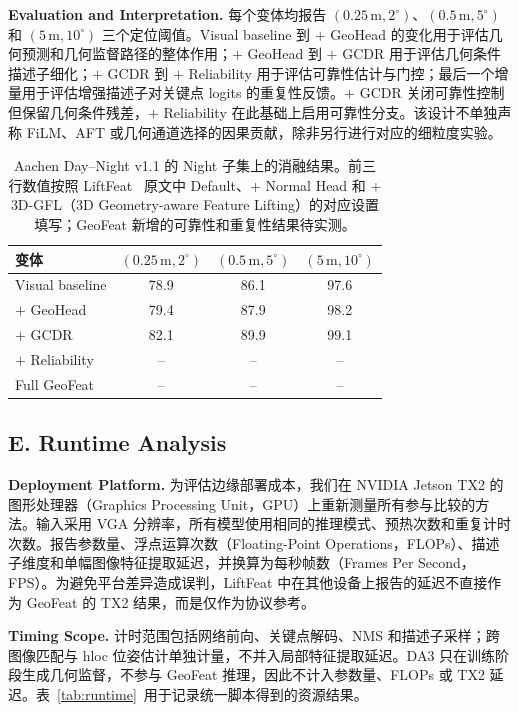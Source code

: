 \documentclass{article}
\begin{document}
\noindent\textbf{Evaluation and Interpretation.} 每个变体均报告 $(0.25\,\mathrm{m},2^\circ)$、$(0.5\,\mathrm{m},5^\circ)$ 和 $(5\,\mathrm{m},10^\circ)$ 三个定位阈值。Visual baseline 到 $+$ GeoHead 的变化用于评估几何预测和几何监督路径的整体作用；$+$ GeoHead 到 $+$ GCDR 用于评估几何条件描述子细化；$+$ GCDR 到 $+$ Reliability 用于评估可靠性估计与门控；最后一个增量用于评估增强描述子对关键点 logits 的重复性反馈。$+$ GCDR 关闭可靠性控制但保留几何条件残差，$+$ Reliability 在此基础上启用可靠性分支。该设计不单独声称 FiLM、AFT 或几何通道选择的因果贡献，除非另行进行对应的细粒度实验。

\begin{table}[!t]
\centering
\caption{Aachen Day--Night v1.1 的 Night 子集上的消融结果。前三行数值按照 LiftFeat~\cite{LiftFeat} 原文中 Default、+ Normal Head 和 + 3D-GFL（3D Geometry-aware Feature Lifting）的对应设置填写；GeoFeat 新增的可靠性和重复性结果待实测。}
\label{tab:ablation-results}
\small
\begin{tabular}{lccc}
\toprule
变体 & $(0.25\,\mathrm{m},2^\circ)$ & $(0.5\,\mathrm{m},5^\circ)$ & $(5\,\mathrm{m},10^\circ)$\\
\midrule
Visual baseline & 78.9 & 86.1 & 97.6\\
$+$ GeoHead & 79.4 & 87.9 & 98.2\\
$+$ GCDR & 82.1 & 89.9 & 99.1\\
$+$ Reliability & -- & -- & --\\
Full GeoFeat & -- & -- & --\\
\bottomrule
\end{tabular}
\end{table}

\subsection{E. Runtime Analysis}
\noindent\textbf{Deployment Platform.} 为评估边缘部署成本，我们在 NVIDIA Jetson TX2 的图形处理器（Graphics Processing Unit，GPU）上重新测量所有参与比较的方法。输入采用 VGA 分辨率，所有模型使用相同的推理模式、预热次数和重复计时次数。报告参数量、浮点运算次数（Floating-Point Operations，FLOPs）、描述子维度和单幅图像特征提取延迟，并换算为每秒帧数（Frames Per Second，FPS）。为避免平台差异造成误判，LiftFeat 中在其他设备上报告的延迟不直接作为 GeoFeat 的 TX2 结果，而是仅作为协议参考。

\noindent\textbf{Timing Scope.} 计时范围包括网络前向、关键点解码、NMS 和描述子采样；跨图像匹配与 hloc 位姿估计单独计量，不并入局部特征提取延迟。DA3 只在训练阶段生成几何监督，不参与 GeoFeat 推理，因此不计入参数量、FLOPs 或 TX2 延迟。表~\ref{tab:runtime}~用于记录统一脚本得到的资源结果。
\end{document}
